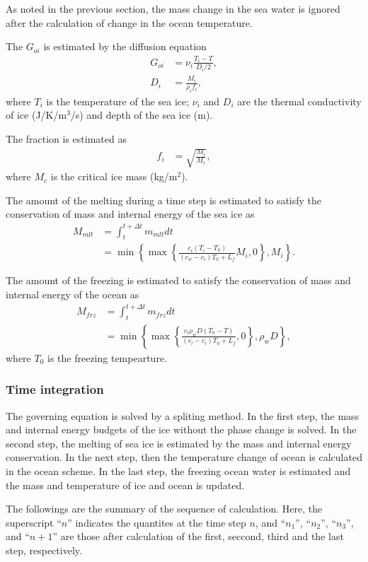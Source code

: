 As noted in the previous section, the mass change in the sea water is ignored after the calculation of change in the ocean temperature.

The $G_{oi}$ is estimated by the diffusion equation
\begin{align}
 G_{oi} &= \nu_i \frac{T_i - T}{D_i/2}, \\
 D_i &= \frac{M_i}{\rho_i f_i},
\end{align}
where $T_i$ is the temperature of the sea ice;
$\nu_i$ and $D_i$ are the thermal conductivity of ice (J/K/m$^3$/s) and depth of the sea ice (m).

The fraction is estimated as
\begin{align}
 f_i &= \sqrt{ \frac{M_i}{M_c} },
\end{align}
where $M_c$ is the critical ice mass (kg/m$^2$).

The amount of the melting during a time step is estimated to  satisfy the conservation of mass and internal energy of the sea ice as
\begin{align}
 M_{mlt} &= \int_t^{t+\Delta t} m_{mlt} dt \nonumber\\
 &= \min\left\{ \max\left\{ \frac{ c_i(T_i-T_0) }{ (c_w-c_i) T_0 + L_f } M_i, 0\right\}, M_i\right\}.
\end{align}

The amount of the freezing is estimated to satisfy the conservation of mass and internal energy of the ocean as
\begin{align}
 M_{frz} &= \int_t^{t+\Delta t} m_{frz} dt \nonumber\\
 &= \min\left\{ \max\left\{ \frac{ c_l \rho_w D ( T_0 - T ) }{ (c_l - c_i)T_0 + L_f }, 0\right\}, \rho_w D\right\},
\end{align}
where $T_0$ is the freezing tempearture.


\subsubsection{Time integration}
The governing equation is solved by a spliting method.
In the first step, the mass and internal energy budgets of the ice without the phase change is solved.
In the second step, the melting of sea ice is estimated by the mass and internal energy conservation.
In the next step, then the temperature change of ocean is calculated in the ocean scheme.
In the last step, the freezing ocean water is estimated and the mass and temperature of ice and ocean is updated.

The followings are the summary of the sequence of calculation.
Here, the superscript ``$n$'' indicates the quantites at the time step $n$, and ``$n_1$'', ``$n_2$'', ``$n_3$'', and ``$n+1$'' are those after calculation of the first, seccond, third and the last step, respectively.


